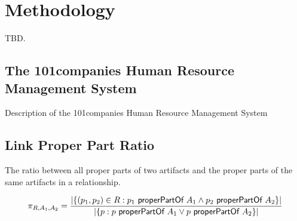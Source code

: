 \chapter{Methodology}
TBD.
\section{The 101companies Human Resource Management System}
Description of the 101companies Human Resource Management System

\section{Link Proper Part Ratio}
The ratio between all proper parts of two artifacts and the proper parts of the same artifacts in a relationship.

\begin{align*}
\pi_{R,A_1,A_2} = \frac{|\{ (p_1,p_2) \in R : p_1 ~\textsf{properPartOf}~ A_1 \wedge p_2 ~\textsf{properPartOf}~ A_2 \}|}{|\{ p : p ~\textsf{properPartOf}~ A_1 \vee p ~\textsf{properPartOf}~ A_2\}|}
\end{align*}